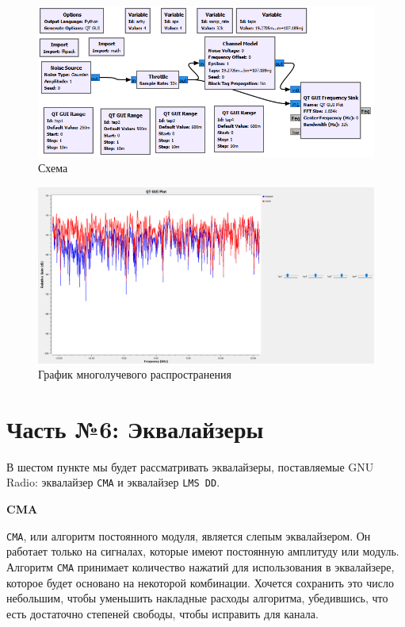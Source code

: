 \documentclass[a4paper]{article}
\begin{document}
            \begin{figure}[H]
                \centering
                \includegraphics[width=\textwidth]{ex_5_1.png}
                \caption{Схема}
                \label{fig:ex_5_1}
            \end{figure}
            
            \begin{figure}[H]
                \centering
                \includegraphics[width=\textwidth]{ex_5_2.png}
                \caption{График многолучевого распространения}
                \label{fig:ex_5_2}
            \end{figure}
            
    \newpage
        \section{Часть №6: Эквалайзеры}
            В шестом пункте мы будет рассматривать эквалайзеры, поставляемые GNU Radio: эквалайзер  \texttt{CMA} и эквалайзер \texttt{LMS DD}. 
            
            \normalsize{\LARGE \textbf{CMA}}
            
             \texttt{CMA}, или алгоритм постоянного модуля, является слепым эквалайзером. Он работает только на сигналах, которые имеют постоянную амплитуду или модуль. Алгоритм  \texttt{CMA} принимает количество нажатий для использования в эквалайзере, которое будет основано на некоторой комбинации. Хочется сохранить это число небольшим, чтобы уменьшить накладные расходы алгоритма, убедившись, что есть достаточно степеней свободы, чтобы исправить для канала. 
            
\end{document}
